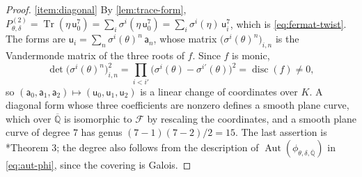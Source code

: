 \documentclass[12pt]{amsart}
\newcommand{\Q}{\mathbb{Q}}
\newcommand{\Qbar}{{\overline{\Q}}}
\newcommand{\calF}{{\mathcal F}}
\newcommand{\sfa}{\mathsf{a}}
\newcommand{\sfu}{\mathsf{u}}
\DeclareMathOperator{\Aut}{Aut}
\DeclareMathOperator{\disc}{disc}
\DeclareMathOperator{\Tr}{Tr}
\numberwithin{equation}{section}
\theoremstyle{definition}
\begin{document}
\begin{proof}
  \eqref{item:diagonal} By \cref{lem:trace-form}, $P^{(2)}_{\theta,\delta} =
  \Tr(\eta\,\sfu_0^{7}) = \sum_{i} \sigma^{i}(\eta\,\sfu_0^{7}) = \sum_{i}
  \sigma^{i}(\eta)\,\sfu_i^{7}$, which is \cref{eq:fermat-twist}. The
  forms are $\sfu_i = \sum_{n} \sigma^{i}(\theta)^{n}\,\sfa_n$, whose
  matrix $\bigl(\sigma^{i}(\theta)^{n}\bigr)_{i,n}$ is the Vandermonde matrix
  of the three roots of $f$. Since $f$ is monic,
  \[
    \det\bigl(\sigma^{i}(\theta)^{n}\bigr)_{i,n}^{2}
    = \prod_{i < i'} \bigl(\sigma^{i}(\theta) - \sigma^{i'}(\theta)\bigr)^{2}
    = \disc(f) \neq 0,
  \]
  so $(\sfa_0,\sfa_1,\sfa_2) \mapsto (\sfu_0,\sfu_1,\sfu_2)$ is a linear change of
  coordinates over $K$. A diagonal form whose three coefficients are nonzero
  defines a smooth plane curve, which over $\Qbar$ is isomorphic to $\calF$ by
  rescaling the coordinates, and a smooth plane curve of degree $7$ has genus
  $(7-1)(7-2)/2 = 15$. The last assertion is \cite{Bruin06-nn2}*{Theorem 3};
  the degree also follows from the description of
  $\Aut(\phi_{\theta,\delta,\Qbar})$ in \cref{eq:aut-phi}, since the covering is Galois.


\end{proof}
\end{document}

